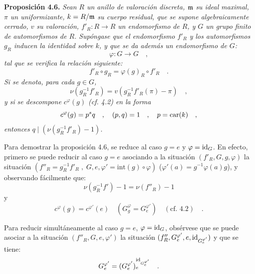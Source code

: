 \medskip
\noindent
\textbf{Proposición 4.6.} \emph{Sean $R$ un anillo de valoración discreta, $\mathfrak m$ su ideal maximal, $\pi$ un uniformizante, $k = R/\mathfrak m$ su cuerpo residual, que se supone algebraicamente cerrado, $v$ su valoración, $f'_R : R \to R$ un endomorfismo de $R$, y $G$ un grupo finito de automorfismos de $R$. Supóngase que el endomorfismo $f'_R$ y los automorfismos $g_R$ inducen la identidad sobre $k$, y que se da además un endomorfismo de $G$:
\[
\varphi : G \longrightarrow G \quad ,
\]
tal que se verifica la relación siguiente:
\[
f'_R \circ g_R = \varphi(g)_R \circ f'_R \quad .
\]
Si se denota, para cada $g \in G$,
\[
\nu(g_R^{-1}f'_R) = v(g_R^{-1}f'_R(\pi) - \pi) \quad ,
\]
y si se descompone $c^\varphi(g)$ (cf. 4.2) en la forma
\[
c^\varphi(g) = p^s q \quad , \quad (p,q) = 1 \quad , \quad p = \operatorname{car}(k) \quad ,
\]
entonces $q \mid (\nu(g_R^{-1}f'_R) - 1)$.}

\medskip

Para demostrar la proposición 4.6, se reduce al caso $g = e$ y $\varphi = \operatorname{id}_G$. En efecto, primero se puede reducir al caso $g = e$ asociando a la situación $(f'_R, G, g, \varphi)$ la situación $(f''_R = g_R^{-1}f'_R \; , \; G, e, \varphi' = \mathrm{int}(g) \circ \varphi)$ ($\varphi'(a) = g^{-1}\varphi(a)g$), y observando fácilmente que:
\[
\nu(g_R^{-1}f') - 1 = \nu(f''_R) - 1
\]
y
\[
c^\varphi(g) = c^{\varphi'}(e) \quad (G_g^\varphi = G_e^{\varphi'}) \quad (\text{cf. 4.2}) \quad .
\]

Para reducir simultáneamente al caso $g = e$, $\varphi = \operatorname{id}_G$, obsérvese que se puede asociar a la situación $(f''_R, G, e, \varphi')$ la situación $(f''_R, G_e^{\varphi'}, e, \operatorname{id}_{G_e^{\varphi'}})$ y que se tiene:
\[
G_e^{\varphi'} = (G_e^{\varphi'})_e^{\operatorname{id}_{G_e^{\varphi'}}} \quad .
\]

